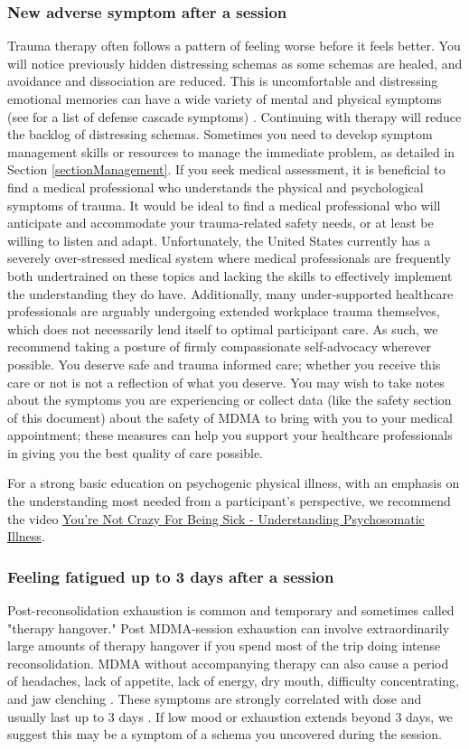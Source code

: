 \documentclass[12pt,letterpaper]{article}
\begin{document}
\subsubsection{New adverse symptom after a session}
Trauma therapy often follows a pattern of feeling worse before it feels better. You will notice previously hidden distressing schemas as some schemas are healed, and avoidance and dissociation are reduced. This is uncomfortable and distressing emotional memories can have a wide variety of mental and physical symptoms (see \textcite{cheetahSigns} for a list of defense cascade symptoms) \cite{kroenkeSomatic,henningsenSomatic}. Continuing with therapy will reduce the backlog of distressing schemas. Sometimes you need to develop symptom management skills or resources to manage the immediate problem, as detailed in Section \ref{sectionManagement}. If you seek medical assessment, it is beneficial to find a medical professional who understands the physical and psychological symptoms of trauma. It would be ideal to find a medical professional who will anticipate and accommodate your trauma-related safety needs, or at least be willing to listen and adapt. Unfortunately, the United States currently has a severely over-stressed medical system where medical professionals are frequently both undertrained on these topics and lacking the skills to effectively implement the understanding they do have. Additionally, many under-supported healthcare professionals are arguably undergoing extended workplace trauma themselves, which does not necessarily lend itself to optimal participant care. As such, we recommend taking a posture of firmly compassionate self-advocacy wherever possible. You deserve safe and trauma informed care; whether you receive this care or not is not a reflection of what you deserve. You may wish to take notes about the symptoms you are experiencing or collect data (like the safety section of this document) about the safety of MDMA to bring with you to your medical appointment; these measures can help you support your healthcare professionals in giving you the best quality of care possible.

For a strong basic education on psychogenic physical illness, with an emphasis on the understanding most needed from a participant's perspective, we recommend the video \href{https://www.youtube.com/watch?v=oHoFqwF2OAU}{You're Not Crazy For Being Sick - Understanding Psychosomatic Illness}.
\subsubsection{Feeling fatigued up to 3 days after a session}
Post-reconsolidation exhaustion is common and temporary and sometimes called "therapy hangover." Post MDMA-session exhaustion can involve extraordinarily large amounts of therapy hangover if you spend most of the trip doing intense reconsolidation. MDMA without accompanying therapy can also cause a period of headaches, lack of appetite, lack of energy, dry mouth, difficulty concentrating, and jaw clenching \cite{vizeliActuteEffects}. These symptoms are strongly correlated with dose and usually last up to 3 days \cite{liechtiGender}. If low mood or exhaustion extends beyond 3 days, we suggest this may be a symptom of a schema you uncovered during the session.
\end{document}
